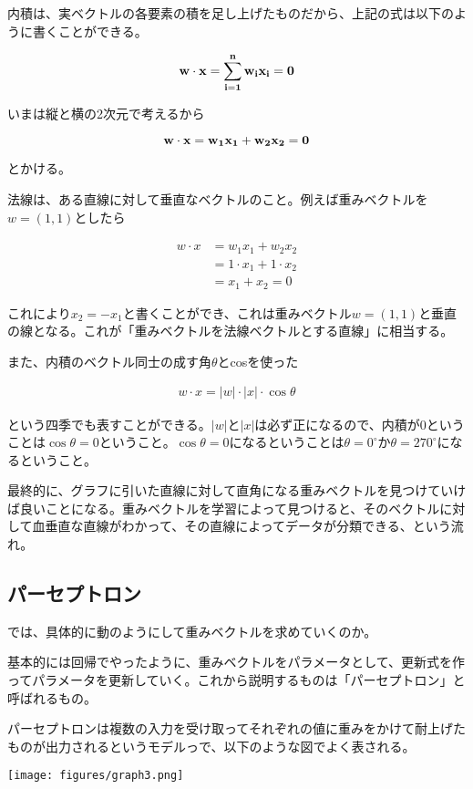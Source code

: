 \documentclass{jsarticle}
\begin{document}
内積は、実ベクトルの各要素の積を足し上げたものだから、上記の式は以下のように書くことができる。

\[
	\bf{w} \cdot \bf{x} = \sum_{i=1}^{n} w_{i} x_{i} = 0
\]

いまは縦と横の2次元で考えるから

\[
	\bf{w} \cdot \bf{x} = w_1 x_1 + w_2 x_2 = 0
\]

とかける。

法線は、ある直線に対して垂直なベクトルのこと。例えば重みベクトルを$w = (1,1)$としたら

\begin{align}
	w \cdot x &= w_1 x_1 + w_2 x_2 \\
    &= 1 \cdot x_1 + 1 \cdot x_2 \\
    &= x_1 + x_2 = 0
\end{align}

これにより$x_2 = -x_1$と書くことができ、これは重みベクトル$w=(1,1)$と垂直の線となる。これが「重みベクトルを法線ベクトルとする直線」に相当する。

また、内積のベクトル同士の成す角$\theta$とcosを使った

\begin{align}
	w \cdot x = |w| \cdot |x| \cdot \cos \theta
\end{align}

という四季でも表すことができる。$|w|と|x|$は必ず正になるので、内積が0ということは$\cos \theta = 0$ということ。$\cos \theta = 0$になるということは$\theta = 0^\circ か \theta = 270^\circ$になるということ。

最終的に、グラフに引いた直線に対して直角になる重みベクトルを見つけていけば良いことになる。重みベクトルを学習によって見つけると、そのベクトルに対して血垂直な直線がわかって、その直線によってデータが分類できる、という流れ。

\subsection{パーセプトロン}
では、具体的に動のようにして重みベクトルを求めていくのか。

基本的には回帰でやったように、重みベクトルをパラメータとして、更新式を作ってパラメータを更新していく。これから説明するものは「パーセプトロン」と呼ばれるもの。

パーセプトロンは複数の入力を受け取ってそれぞれの値に重みをかけて耐上げたものが出力されるというモデルっで、以下のような図でよく表される。

\begin{center}
  \texttt{[image: figures/graph3.png]}
\end{center}
\end{document}
